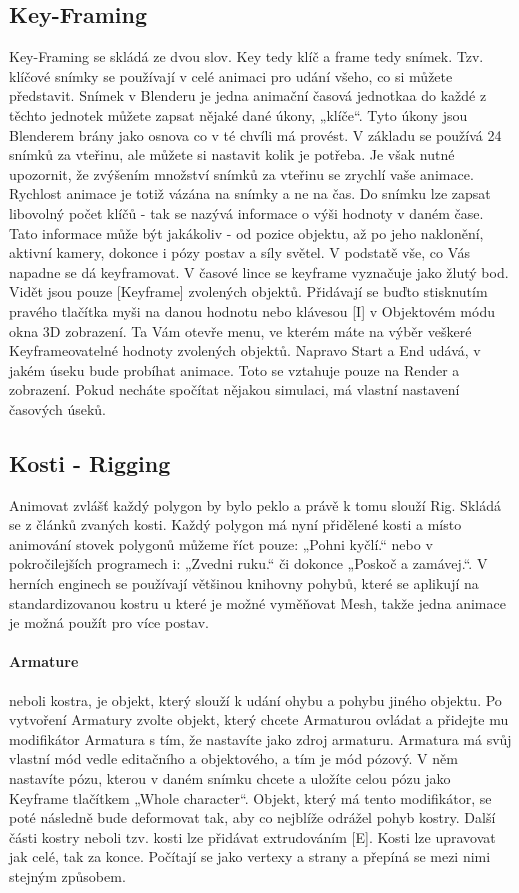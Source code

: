 \documentclass[12pt,a4paper]{report}
\begin{document}
	\subsection{Key-Framing}
	\label{section:keyframes}
	Key-Framing se skládá ze dvou slov. Key tedy klíč a frame tedy snímek.
	Tzv. klíčové snímky se používají v celé animaci pro udání všeho, co si
	můžete představit. Snímek v Blenderu je jedna animační časová jednotkaa do každé z těchto jednotek můžete zapsat nějaké dané úkony, „klíče“.
	Tyto úkony jsou Blenderem brány jako osnova co v té chvíli má provést. V
	základu se používá 24 snímků za vteřinu, ale můžete si nastavit kolik je
	potřeba. Je však nutné upozornit, že zvýšením množství snímků za
	vteřinu se zrychlí vaše animace. Rychlost animace je totiž vázána na
	snímky a ne na čas. Do snímku lze zapsat libovolný počet klíčů - tak se
	nazývá informace o výši hodnoty v daném čase. Tato informace může být
	jakákoliv - od pozice objektu, až po jeho naklonění, aktivní kamery,
	dokonce i pózy postav a síly světel. V podstatě vše, co Vás napadne se dá
	keyframovat. V časové lince se keyframe vyznačuje jako žlutý bod. Vidět
	jsou pouze [Keyframe] zvolených objektů. Přidávají se buďto stisknutím
	pravého tlačítka myši na danou hodnotu nebo klávesou [I] v Objektovém
	módu okna 3D zobrazení. Ta Vám otevře menu, ve kterém máte na výběr
	veškeré Keyframeovatelné hodnoty zvolených objektů.
	Napravo Start a End udává, v jakém úseku bude probíhat animace. Toto
	se vztahuje pouze na Render a zobrazení. Pokud necháte spočítat nějakou
	simulaci, má vlastní nastavení časových úseků.
	
	\subsection{Kosti - Rigging}
	
	Animovat zvlášť každý polygon by bylo peklo a právě k tomu slouží Rig.
	Skládá se z článků zvaných kosti. Každý polygon má nyní přidělené kosti
	a místo animování stovek polygonů můžeme říct pouze: „Pohni kyčlí.“
	nebo v pokročilejších programech i: „Zvedni ruku.“ či dokonce „Poskoč
	a zamávej.“. V herních enginech se používají většinou knihovny pohybů,
	které se aplikují na standardizovanou kostru u které je možné vyměňovat
	Mesh, takže jedna animace je možná použít pro více postav.
	\paragraph{Armature} neboli kostra, je objekt, který slouží k udání ohybu a pohybu
	jiného objektu. Po vytvoření Armatury zvolte objekt, který chcete
	Armaturou ovládat a přidejte mu modifikátor Armatura s tím, že nastavíte
	jako zdroj armaturu. Armatura má svůj vlastní mód vedle editačního a
	objektového, a tím je mód pózový. V něm nastavíte pózu, kterou v daném
	snímku chcete a uložíte celou pózu jako Keyframe tlačítkem „Whole
	character“. Objekt, který má tento modifikátor, se poté následně bude
	deformovat tak, aby co nejblíže odrážel pohyb kostry. Další části kostry
	neboli tzv. kosti lze přidávat extrudováním [E]. Kosti lze upravovat jak
	celé, tak za konce. Počítají se jako vertexy a strany a přepíná se mezi
	nimi stejným způsobem.
	
\end{document}
